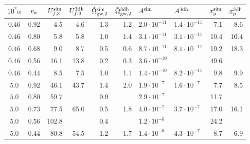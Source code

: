 \begin{tabular}{cc | rr | rr | ll | rr}
\hline\hline
$10^2\alpha$ & $v_{\rm w}$ & $\bar{U}_{f,3}^{\rm sim}$ & $\bar{U}_{f,3}^{\rm 3dh}$ & $\tilde\Omega_{\rm gw,2}^{\rm sim}$ & $\tilde\Omega_{\rm gw,2}^{\rm 3dh}$ & \hspace{1em} $A^{\rm sim}$ & \hspace{1em} $A^{\rm 3dh}$ & $x_{\rm p}^{\rm sim}$ & $x_{\rm p}^{\rm 3dh}$ \\ 
\hline 
$ 0.46 $ & 0.92 &  4.5 &  4.6 & 1.3 & 1.2 & $ 2.0\cdot 10^{-11} $ & $ 1.4\cdot 10^{-11} $ &  7.1 &  8.6 \\ 
$ 0.46 $ & 0.80 &  5.8 &  5.8 & 1.0 & 1.4 & $ 3.1\cdot 10^{-11} $ & $ 3.1\cdot 10^{-11} $ & 10.4 & 10.4 \\ 
$ 0.46 $ & 0.68 &  9.0 &  8.7 & 0.5 & 0.6 & $ 8.7\cdot 10^{-11} $ & $ 8.1\cdot 10^{-11} $ & 19.2 & 18.3 \\ 
$ 0.46 $ & 0.56 & 16.1 & 13.8 & 0.2 & 0.3 & $ 3.6\cdot 10^{-10} $ &          & 49.6 &      \\ 
$ 0.46 $ & 0.44 &  8.5 &  7.5 & 1.0 & 1.1 & $ 1.4\cdot 10^{-10} $ & $ 8.2\cdot 10^{-11} $ &  9.8 &  9.9 \\ 
$ 5.0 $ & 0.92 & 46.1 & 43.7 & 1.4 & 2.0 & $ 1.9\cdot 10^{-7} $ & $ 1.6\cdot 10^{-7} $ &  7.7 &  8.5 \\ 
$ 5.0 $ & 0.80 & 59.7 &      & 0.9 &     & $ 2.9\cdot 10^{-7} $ &          & 11.7 &      \\ 
$ 5.0 $ & 0.73 & 77.5 & 65.0 & 0.5 & 1.8 & $ 4.0\cdot 10^{-7} $ & $ 3.7\cdot 10^{-7} $ & 17.0 & 16.1 \\ 
$ 5.0 $ & 0.56 & 102.8 &      & 0.4 &     & $ 1.2\cdot 10^{-6} $ &          & 24.2 &      \\ 
$ 5.0 $ & 0.44 & 80.8 & 54.5 & 1.2 & 1.7 & $ 1.4\cdot 10^{-6} $ & $ 4.3\cdot 10^{-7} $ &  8.7 &  6.9 \\ 
\hline\hline 
\end{tabular} 
